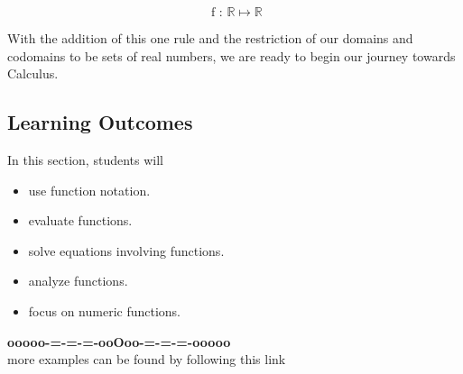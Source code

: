 \documentclass{ximera}
\begin{document}
\[
\text{ f : } \mathbb{R} \mapsto \mathbb{R}
\]





With the addition of this one rule and the restriction of our domains and codomains to be sets of real numbers, we are ready to begin our journey towards Calculus.








\subsection*{Learning Outcomes}


\begin{sectionOutcomes}
In this section, students will 

\begin{itemize}
\item use function notation.
\item evaluate functions.
\item solve equations involving functions.
\item analyze functions.
\item focus on numeric functions.
\end{itemize}
\end{sectionOutcomes}







\begin{center}
\textbf{\textcolor{green!50!black}{ooooo-=-=-=-ooOoo-=-=-=-ooooo}} \\

more examples can be found by following this link\\ 

\end{center}
\end{document}
